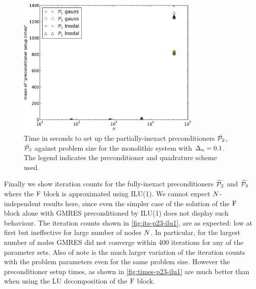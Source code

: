 \begin{figure}
  \centering
  \includegraphics[width=0.8\textwidth]{plots/linear_solvers_p2p3/implicitexact-meanofpreconditionersetuptimesvsinitialnnode.pdf}
  \caption{Time in seconds to set up the partially-inexact preconditioners $\bar{\mathcal{P}_2}$, $\bar{\mathcal{P}_3}$ against problem size for the monolithic system with $\Delta_{n}=0.1$.
    The legend indicates the preconditioner and quadrature scheme used.
}
  \label{fig:times-p23-exact}
\end{figure}


Finally we show iteration counts for the fully-inexact preconditioners $\widetilde{\mathcal{P}_2}$ and $\widetilde{\mathcal{P}_3}$ where the $\mathrm{F}$ block is approximated using ILU(1).
We cannot expect $N$-independent results here, since even the simpler case of the solution of the $\mathrm{F}$ block alone with GMRES preconditioned by ILU(1) does not display such behaviour.
The iteration counts shown in \cref{fig:its-p23-ilu1}, are as expected: low at first but ineffective for large number of nodes $N$.
In particular, for the largest number of nodes GMRES did not converge within 400 iterations for any of the parameter sets.
Also of note is the much larger variation of the iteration counts with the problem parameters even for the same problem size.
However the preconditioner setup times, as shown in \cref{fig:times-p23-ilu1} are much better than when using the LU decomposition of the $\mathrm{F}$ block.


